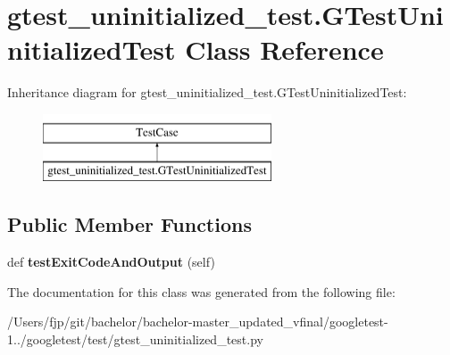 \hypertarget{classgtest__uninitialized__test_1_1_g_test_uninitialized_test}{}\section{gtest\+\_\+uninitialized\+\_\+test.\+G\+Test\+Uninitialized\+Test Class Reference}
\label{classgtest__uninitialized__test_1_1_g_test_uninitialized_test}
Inheritance diagram for gtest\+\_\+uninitialized\+\_\+test.\+G\+Test\+Uninitialized\+Test\+:\begin{figure}[H]
\begin{center}
\leavevmode
\includegraphics[height=2.000000cm]{classgtest__uninitialized__test_1_1_g_test_uninitialized_test}
\end{center}
\end{figure}
\subsection*{Public Member Functions}
\begin{DoxyCompactItemize}
\item 
\mbox{\label{classgtest__uninitialized__test_1_1_g_test_uninitialized_test_ace4bbad0abec476b03a91bb453e6451c}} 
def {\bfseries test\+Exit\+Code\+And\+Output} (self)
\end{DoxyCompactItemize}


The documentation for this class was generated from the following file\+:\begin{DoxyCompactItemize}
\item 
/\+Users/fjp/git/bachelor/bachelor-\/master\+\_\+updated\+\_\+vfinal/googletest-\/1../googletest/test/gtest\+\_\+uninitialized\+\_\+test.\+py\end{DoxyCompactItemize}
